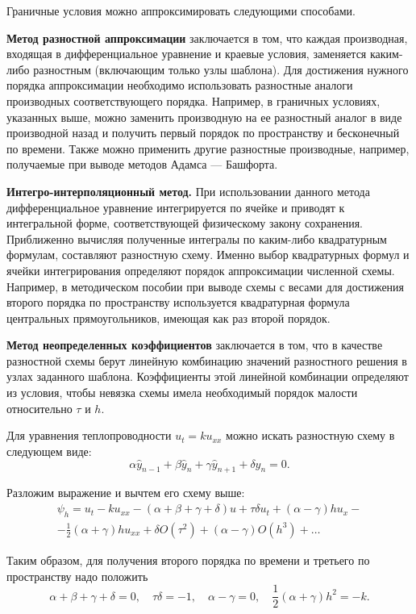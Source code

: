\documentclass[12pt, a4paper]{article}
\begin{document}
\begin{enumerate}
		Граничные условия можно аппроксимировать следующими способами.
		
		\textbf{Метод разностной аппроксимации} заключается в том, что каждая производная, входящая в дифференциальное уравнение и краевые условия, заменяется каким-либо разностным (включающим только узлы шаблона). Для достижения нужного порядка аппроксимации необходимо использовать разностные аналоги производных соответствующего порядка. Например, в граничных условиях, указанных выше, можно заменить производную на ее разностный аналог в виде производной назад и получить первый порядок по пространству и бесконечный по времени. Также можно применить другие разностные производные, например, получаемые при выводе методов Адамса --- Башфорта.
		
		\textbf{Интегро-интерполяционный метод.} При использовании данного метода дифференциальное уравнение интегрируется по ячейке и приводят к интегральной форме, соответствующей физическому закону сохранения. Приближенно вычисляя полученные интегралы по каким-либо квадратурным формулам, составляют разностную схему. Именно выбор квадратурных формул и ячейки интегрирования определяют порядок аппроксимации численной схемы. Например, в методическом пособии при выводе схемы с весами для достижения второго порядка по пространству используется квадратурная формула центральных прямоугольников, имеющая как раз второй порядок.
		
		\textbf{Метод неопределенных коэффициентов} заключается в том, что в качестве разностной схемы берут линейную комбинацию значений разностного решения в узлах заданного шаблона. Коэффициенты этой линейной комбинации определяют из условия, чтобы невязка схемы имела необходимый порядок малости относительно $\tau$ и $h$.
		
		Для уравнения теплопроводности $u_t = k u_{xx}$ можно искать разностную схему в следующем виде:
		\[
		\alpha\hat y_{n-1}+\beta\hat y_n+\gamma\hat y_{n+1}+\delta y_n=0.
		\]
		
		Разложим выражение и вычтем его схему выше:
		\begin{multline*}
			\psi_h = u_t - k u_{xx} - (\alpha+\beta+\gamma+\delta)u + \tau \delta u_t + (\alpha-\gamma)h u_x - \\
			- \frac12(\alpha+\gamma)h u_{xx} + \delta O(\tau^2) + (\alpha-\gamma) O(h^3) + \dots
		\end{multline*}
		
		Таким образом, для получения второго порядка по времени и третьего по пространству надо положить
		\[
		\alpha+\beta+\gamma+\delta = 0, \quad \tau\delta = -1, \quad \alpha - \gamma = 0, \quad \frac12(\alpha+\gamma)h^2 = -k.
		\]
		

\end{enumerate}
\end{document}
